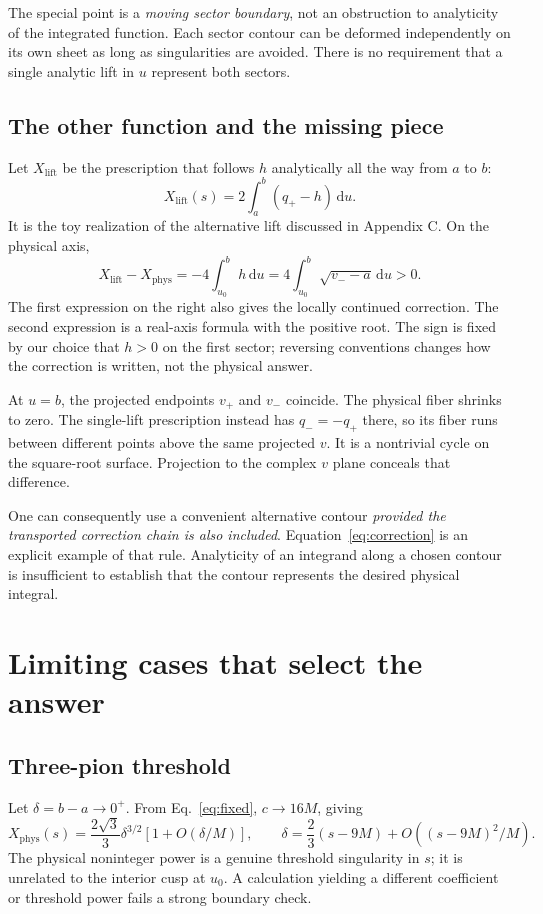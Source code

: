 \documentclass[11pt,a4paper]{article}
\newcommand{\dd}{\,\mathrm d}
\newcommand{\phys}{\mathrm{phys}}
\begin{document}
The special point is a \emph{moving sector boundary}, not an obstruction to analyticity of the integrated function. Each sector contour can be deformed independently on its own sheet as long as singularities are avoided. There is no requirement that a single analytic lift in $u$ represent both sectors.

\subsection{The other function and the missing piece}
Let $X_{\mathrm{lift}}$ be the prescription that follows $h$ analytically all the way from $a$ to $b$:
\begin{equation}
 X_{\mathrm{lift}}(s)=2\int_a^b(q_+-h)\dd u.
\end{equation}
It is the toy realization of the alternative lift discussed in Appendix C. On the physical axis,
\begin{equation}
 \boxed{X_{\mathrm{lift}}-X_{\phys}
 =-4\int_{u_0}^b h\dd u
 =4\int_{u_0}^b\sqrt{v_--a}\dd u>0.}
 \label{eq:correction}
\end{equation}
The first expression on the right also gives the locally continued correction. The second expression is a real-axis formula with the positive root. The sign is fixed by our choice that $h>0$ on the first sector; reversing conventions changes how the correction is written, not the physical answer.

At $u=b$, the projected endpoints $v_+$ and $v_-$ coincide. The physical fiber shrinks to zero. The single-lift prescription instead has $q_-=-q_+$ there, so its fiber runs between different points above the same projected $v$. It is a nontrivial cycle on the square-root surface. Projection to the complex $v$ plane conceals that difference.

One can consequently use a convenient alternative contour \emph{provided the transported correction chain is also included}. Equation~\eqref{eq:correction} is an explicit example of that rule. Analyticity of an integrand along a chosen contour is insufficient to establish that the contour represents the desired physical integral.

\section{Limiting cases that select the answer}
\subsection{Three-pion threshold}
Let $\delta=b-a\to0^+$. From Eq.~\eqref{eq:fixed}, $c\to16M$, giving
\begin{equation}
 X_{\phys}(s)=\frac{2\sqrt3}{3}\delta^{3/2}[1+O(\delta/M)],
 \qquad \delta=\frac23(s-9M)+O((s-9M)^2/M).
 \label{eq:threshold}
\end{equation}
The physical noninteger power is a genuine threshold singularity in $s$; it is unrelated to the interior cusp at $u_0$. A calculation yielding a different coefficient or threshold power fails a strong boundary check.
\end{document}
